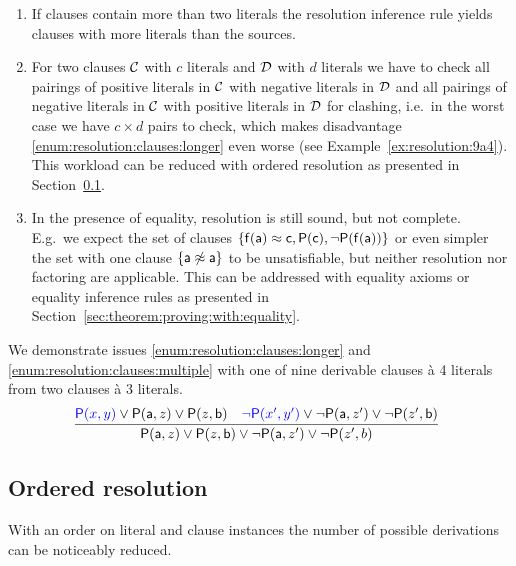 \begin{enumerate}
	\item\label{enum:resolution:clauses:longer}
	If clauses contain more than two literals the resolution inference rule
	yields clauses with more literals than the sources.

	\item\label{enum:resolution:clauses:multiple}
	For two clauses \( \mathcal{C} \) with \( c \) literals
	and \( \mathcal{D} \) with \( d \) literals
	we have to check all pairings
	of positive literals in \( \mathcal{C} \)
	with negative literals in \( \mathcal{D} \)
	and all pairings of negative literals in \( \mathcal{C} \)
	with positive literals in \( \mathcal{D} \) for clashing,
	i.e.~in the worst case we have \( c\times d \) pairs to check,
	which makes disadvantage \ref{enum:resolution:clauses:longer} even worse
	(see Example~\ref{ex:resolution:9a4}).
	This workload can be reduced with ordered resolution as presented
	in Section~\ref{sec:ordered:resolution}.

	\item In the presence of equality, resolution is still sound, but not complete.
	E.g.~we expect the set of clauses
	\( \{ \mathsf{f}(\mathsf{a}) \approx \mathsf{c}, \mathsf{P}(\mathsf{c}), \lnot\mathsf{P}(\mathsf{f}(\mathsf{a})) \} \)
	or even simpler the set with one clause
	\( \{ \mathsf{a}\not\approx\mathsf{a} \} \)
	to be unsatisfiable, but neither resolution nor factoring
	are applicable. This can be addressed with equality axioms or equality inference rules
	as presented in Section~\ref{sec:theorem:proving:with:equality}.
\end{enumerate}

\begin{example}\label{ex:resolution:9a4}
	We demonstrate issues \ref{enum:resolution:clauses:longer} 
	and \ref{enum:resolution:clauses:multiple} with  
	one of {nine} derivable clauses à 4 literals from two clauses à 3 literals.
	\begin{gather*}
	\infer[]{\mP(\ma,z)\lor\mP(z,\mb)\lor\lnot\mP(\ma,z')\lor\lnot\mP(z',b)}
	{{\colN\mP(x,y)}\lor\mP(\ma,z)\lor\mP(z,\mb) & {\colN\lnot\mP(x',y')}\lor\lnot\mP(\ma,z')\lor\lnot\mP(z',\mb)}
	\end{gather*}
\end{example}

\subsection{Ordered resolution}\label{sec:ordered:resolution}

With an order on literal and clause instances the number of possible derivations can be noticeably reduced.

